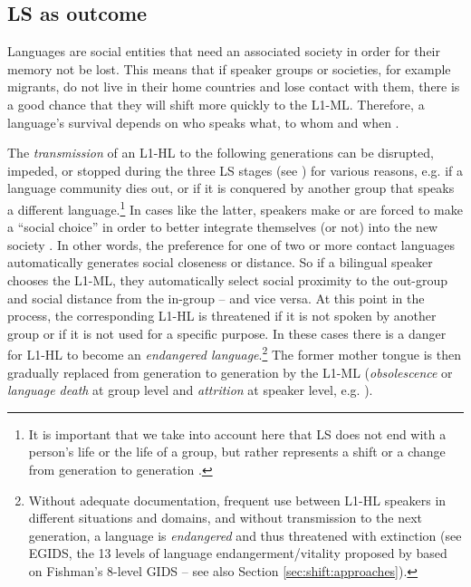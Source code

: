 \documentclass[output=paper]{langscibook}
\begin{document}
\subsection{LS as outcome}\label{sec:karnopp:1.2}

Languages are social entities that need an associated society in order for their memory not be lost. This means that if speaker groups or societies, for example migrants, do not live in their home countries and lose contact with them, there is a good chance that they will shift more quickly to the L1-ML. Therefore, a language's survival depends on who speaks what, to whom and when \parencite{Fishman1964}.

The \emph{transmission} of an L1-HL to the following generations can be disrupted, impeded, or stopped during the three LS stages (see ) for various reasons, e.g. if a language community dies out, or if it is conquered by another group that speaks a different language.\footnote{It is important that we take into account here that LS does not end with a person's life or the life of a group, but rather represents a shift or a change from generation to generation \parencite[195]{Jagodic2011}.} In cases like the latter, speakers make or are forced to make a ``social choice'' in order to better integrate themselves (or not) into the new society \parencite[325]{Ostler2011}. In other words, the preference for one of two or more contact languages automatically generates social closeness or distance. So if a bilingual speaker chooses the L1-ML, they automatically select social proximity to the out-group and social distance from the in-group -- and vice versa. At this point in the process, the corresponding L1-HL is threatened if it is not spoken by another group or if it is not used for a specific purpose. In these cases there is a danger for L1-HL to become an \emph{endangered language}.\footnote{Without adequate documentation, frequent use between L1-HL speakers in different situations and domains, and without transmission to the next generation, a language is \emph{endangered} and thus threatened with extinction (see EGIDS, the 13 levels of language endangerment/vitality proposed by \cite[2]{Brenzinger2003} based on Fishman's \parencite*{Fishman1991} 8-level GIDS -- see also Section \ref{sec:shift:approaches}).} The former mother tongue is then gradually replaced from generation to generation by the L1-ML (\emph{obsolescence} or \emph{language death} at group level and \emph{attrition} at speaker level, e.g. \citealt{Crystal2000}).
\end{document}
